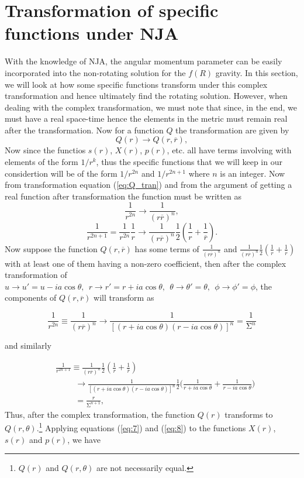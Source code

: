 \documentclass[12pt,a4paper,oneside]{book}
\newcommand{\eq}[2]{\begin{equation} \label{eq:#1} #2 \end{equation}}
\newcommand{\seq}[2]{\eq{#1}{\begin{split} #2 \end{split}}}
\newcommand{\Eref}[1]{(\ref{eq:#1})}
\begin{document}
\section{Transformation of specific functions under NJA}
With the knowledge of NJA, the angular momentum parameter can be easily incorporated into the non-rotating solution for the $f(R)$ gravity. In this section, we will look at how some specific functions transform under this complex transformation and hence ultimately find the rotating solution. However, when dealing with the complex transformation, we must note that since, in the end, we must have a real space-time hence the elements in the metric must remain real after the transformation. Now for a function $Q$ the transformation are given by \cite{NJA_Revisited,Source_and_singularity} \eq{Q_tran}{Q\left(r\right)\to Q\left(r,\overline{r}\right), }
Now since the functios $s(r)$, $X(r)$, $p(r)$, etc. all have terms involving with elements of the form $1/r^k$, thus the specific functions that we will keep in our considertion will be of the form $1/r^{2n}$ and $1/r^{2n+1}$ where $n$ is an integer. Now from transformation equation \Eref{Q_tran} and from the argument of getting a real function after transformation the function must be written as
\eq{}{\frac{1}{r^{2n}}\rightarrow \frac{1}{{\left(r\overline{r}\right)}^n},} 
\eq{}{\frac{1}{r^{2n+1}}= \frac{1}{r^{2n}}\frac{1}{r}\to \frac{1}{{\left(r\overline{r}\right)}^n}\frac{1}{2}\left(\frac{1}{r}+\frac{1}{\overline{r}}\right).}
Now suppose the function $Q\left(r,\overline{r}\right)$ has some terms of $\frac{1}{{\left(r\overline{r}\right)}^n}$ and $\frac{1}{{\left(r\overline{r}\right)}^{n}}\frac{1}{2}\left(\frac{1}{r}+\frac{1}{\overline{r}}\right)$ with at least one of them having a non-zero coefficient, then after the complex transformation of $u\to u'=u-ia \cos{\theta},\ \ r\to r'=r+ia\cos{\theta},\ \ \theta \to {\theta }'=\theta ,\ \ \phi \to {\phi }'=\phi$, the components of $Q\left(r,\overline{r}\right)$ will transform as

\eq{7}{\frac{1}{r^{2n}}\equiv \frac{1}{{\left(r\overline{r}\right)}^n}\to \frac{1}{\left[(r+ia\cos{\theta})(r-ia\cos{\theta})\right]^n}=\frac{1}{{\mathrm{\Sigma }}^n}}

\noindent and similarly

\seq{8}{&\frac{1}{r^{2n+1}}\equiv \frac{1}{{\left(r\overline{r}\right)}^n}\frac{1}{2}\left(\frac{1}{r}+\frac{1}{\overline{r}}\right)
\\&\hspace{1cm}\to \frac{1}{{\left[(r+ia\cos{\theta})(r-ia\cos{\theta})\right]}^n}\frac{1}{2}\bigg(\frac{1}{r+ia\cos{\theta}}+\frac{1}{r-ia\cos{\theta}}\bigg)\\&\hspace{1cm}=\frac{r}{{\mathrm{\Sigma }}^{n+1}},}
Thus, after the complex transformation, the function $Q(r)$ transforms to $Q(r,\theta )$.\footnote{$Q\left(r\right)$ and $Q(r,\theta)$ are not necessarily equal.}
Applying equations \Eref{7} and \Eref{8} to the functions $X\left(r\right)$, $s(r)$ and $p\left(r\right)$, we have 
\end{document}
